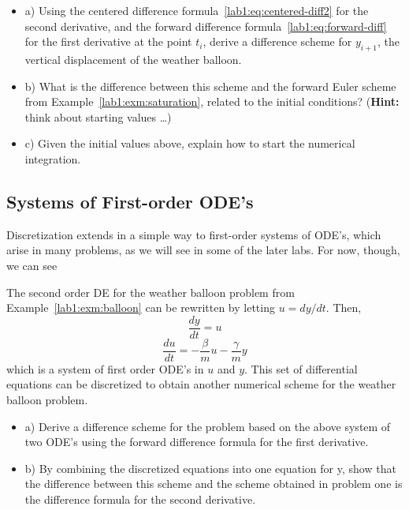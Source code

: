 \begin{problem}
  \label{lab1:prob:osc}
  \begin{itemize}
  \item a)
  Using the centered difference formula~\eqref{lab1:eq:centered-diff2}
  for the second derivative, and the forward difference
  formula~\eqref{lab1:eq:forward-diff} for the first derivative at the
  point $t_i$, derive a difference scheme for $y_{i+1}$, the vertical
  displacement of the weather balloon.
  
  \item b)
  What is the difference between this scheme and the forward
  Euler scheme from Example~\ref{lab1:exm:saturation}, related to the
  initial conditions?  (\textbf{Hint:} think about starting values \dots)
  
  \item c)
   Given the initial values above, explain how to start the numerical
  integration.

  \end{itemize}
\end{problem}

\subsection{Systems of First-order ODE's}
\label{lab1:sec:ode-system}

Discretization extends in a simple way to first-order systems of
ODE's, which arise in many problems, as we will see in some of the
later labs.  For now, though, we can see 

\begin{example}
  The second order DE for the weather balloon problem from
  Example~\ref{lab1:exm:balloon}
  can be rewritten by letting $u=dy/dt$.  Then,
  \[
    \frac{dy}{dt} = u 
  \]
  \[
    \frac{du}{dt} = -\frac{\beta}{m} u - \frac{\gamma}{m} y
  \]
  which is a system of first order ODE's in $u$ and $y$.  
  This set of differential equations can be discretized to obtain
  another numerical scheme for the weather balloon problem.
\end{example}

\begin{problem}
  \label{lab1:prob:osc-system}
  \begin{itemize}
  \item a)
  Derive a difference scheme for the problem based on the
  above system of two ODE's using the forward difference formula for
  the first derivative. 

  \item  b)
  By combining the discretized equations into  one  equation for y,
 show that the difference between this scheme and the scheme  obtained
 in problem one is the difference formula for the second derivative.
 
 \end {itemize}

\end{problem}


